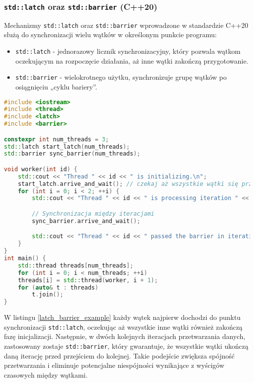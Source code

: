\subsubsection{\texttt{std::latch} oraz \texttt{std::barrier} (C++20)}
Mechanizmy \texttt{std::latch} oraz \texttt{std::barrier} wprowadzone w standardzie C++20 służą do synchronizacji wielu wątków w określonym punkcie programu:
\begin{itemize}
    \item \texttt{std::latch} - jednorazowy licznik synchronizacyjny, który pozwala wątkom oczekującym na rozpoczęcie działania, aż inne wątki zakończą przygotowanie.
    \item \texttt{std::barrier} - wielokrotnego użytku, synchronizuje grupę wątków po osiągnięciu „cyklu bariery”.
\end{itemize}
\begin{lstlisting}[language=C++, style=VS2017,  caption={Przykład użycia std::latch oraz std::barrier}, label={latch_barrier_example}]
#include <iostream>
#include <thread>
#include <latch>
#include <barrier>

constexpr int num_threads = 3;
std::latch start_latch(num_threads);
std::barrier sync_barrier(num_threads);

void worker(int id) {
    std::cout << "Thread " << id << " is initializing.\n";
    start_latch.arrive_and_wait(); // czekaj aż wszystkie wątki się przygotują
    for (int i = 0; i < 2; ++i) {
        std::cout << "Thread " << id << " is processing iteration " << i << ".\n";

        // Synchronizacja między iteracjami
        sync_barrier.arrive_and_wait();

        std::cout << "Thread " << id << " passed the barrier in iteration " << i << ".\n";
    }
}
int main() {
    std::thread threads[num_threads];
    for (int i = 0; i < num_threads; ++i)
    threads[i] = std::thread(worker, i + 1);
    for (auto& t : threads)
        t.join();
}
\end{lstlisting}    
W listingu \ref{latch_barrier_example} każdy wątek najpierw dochodzi do punktu synchronizacji \texttt{std::latch}, oczekując aż wszystkie inne wątki również zakończą fazę inicjalizacji. Następnie, w dwóch kolejnych iteracjach przetwarzania danych, zastosowany zostaje \texttt{std::barrier}, który gwarantuje, że wszystkie wątki ukończą daną iterację przed przejściem do kolejnej. Takie podejście zwiększa spójność przetwarzania i eliminuje potencjalne niespójności wynikające z wyścigów czasowych między wątkami.

